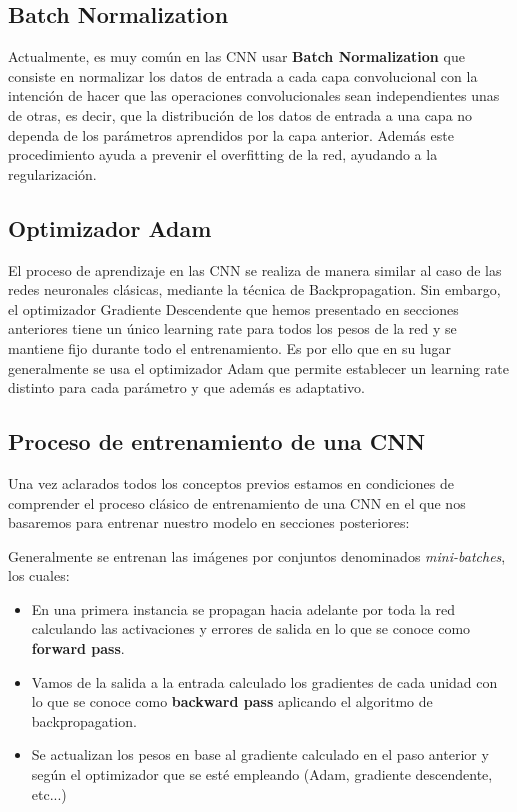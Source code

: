         \subsection{Batch Normalization}
            \noindent Actualmente, es muy común en las CNN usar \textbf{Batch Normalization} que consiste en normalizar los datos de entrada a cada capa convolucional con la intención de hacer que las operaciones convolucionales sean independientes unas de otras, es decir, que la distribución de los datos de entrada a una capa no dependa de los parámetros aprendidos por la capa anterior. Además este procedimiento ayuda a prevenir el overfitting de la red, ayudando a la regularización.

        \subsection{Optimizador Adam}
            El proceso de aprendizaje en las CNN se realiza de manera similar al caso de las redes neuronales clásicas, mediante la técnica de Backpropagation. Sin embargo, el optimizador Gradiente Descendente que hemos presentado en secciones anteriores tiene un único learning rate para todos los pesos de la red y se mantiene fijo durante todo el entrenamiento. Es por ello que en su lugar generalmente se usa el optimizador Adam que permite establecer un learning rate distinto para cada parámetro y que además es adaptativo.

        \subsection{Proceso de entrenamiento de una CNN}

            \noindent Una vez aclarados todos los conceptos previos estamos en condiciones de comprender el proceso clásico de entrenamiento de una CNN en el que nos basaremos para entrenar nuestro modelo en secciones posteriores: 

            \medskip

            \noindent Generalmente se entrenan las imágenes por conjuntos denominados \textit{mini-batches}, los cuales: 

            \begin{itemize}
                \item En una primera instancia se propagan hacia adelante por toda la red calculando las activaciones y errores de salida en lo que se conoce como \textbf{forward pass}.
                \item Vamos de la salida a la entrada calculado los gradientes de cada unidad con lo que se conoce como \textbf{backward pass} aplicando el algoritmo de backpropagation.
                \item Se actualizan los pesos en base al gradiente calculado en el paso anterior y según el optimizador que se esté empleando (Adam, gradiente descendente, etc...)
            \end{itemize}


